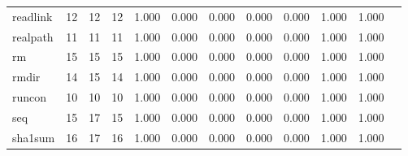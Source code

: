 \begin{longtable}{lp{1.00cm}p{1.00cm}p{1.00cm}p{1.00cm}p{1.00cm}p{1.00cm}p{1.00cm}p{1.00cm}p{1.00cm}p{1.00cm}p{1.00cm}}
readlink  &                           12 &                 12 &                                12 &                                      1.000 &                                  0.000 &                                        0.000 &                             0.000 &                                   0.000 &                        1.000 &                                        1.000 \\
realpath  &                           11 &                 11 &                                11 &                                      1.000 &                                  0.000 &                                        0.000 &                             0.000 &                                   0.000 &                        1.000 &                                        1.000 \\
rm        &                           15 &                 15 &                                15 &                                      1.000 &                                  0.000 &                                        0.000 &                             0.000 &                                   0.000 &                        1.000 &                                        1.000 \\
rmdir     &                           14 &                 15 &                                14 &                                      1.000 &                                  0.000 &                                        0.000 &                             0.000 &                                   0.000 &                        1.000 &                                        1.000 \\
runcon    &                           10 &                 10 &                                10 &                                      1.000 &                                  0.000 &                                        0.000 &                             0.000 &                                   0.000 &                        1.000 &                                        1.000 \\
seq       &                           15 &                 17 &                                15 &                                      1.000 &                                  0.000 &                                        0.000 &                             0.000 &                                   0.000 &                        1.000 &                                        1.000 \\
sha1sum   &                           16 &                 17 &                                16 &                                      1.000 &                                  0.000 &                                        0.000 &                             0.000 &                                   0.000 &                        1.000 &                                        1.000 \\

\end{longtable}
